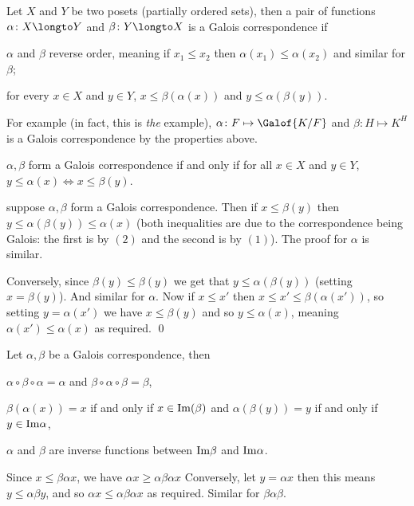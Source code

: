 \bdefn

    Let $X$ and $Y$ be two posets (partially ordered sets), then a pair of functions $\alpha\colon X\longto Y$ and $\beta\colon Y\longto X$ is a {\emphcolor Galois correspondence} if
    \benum
        \item $\alpha$ and $\beta$ reverse order, meaning if $x_1\leq x_2$ then $\alpha(x_1)\leq\alpha(x_2)$ and similar for $\beta$;
        \item for every $x\in X$ and $y\in Y$, $x\leq\beta(\alpha(x))$ and $y\leq\alpha(\beta(y))$.
    \eenum

\edefn

For example (in fact, this is {\it the} example), $\alpha\colon F\mapsto\Galof{K/F}$ and $\beta\colon H\mapsto K^H$ is a Galois correspondence by the properties above.

\bprop

    $\alpha,\beta$ form a Galois correspondence if and only if for all $x\in X$ and $y\in Y$, $y\leq\alpha(x)\iff x\leq\beta(y)$.

\eprop

\Proof suppose $\alpha,\beta$ form a Galois correspondence.
Then if $x\leq\beta(y)$ then $y\leq\alpha(\beta(y))\leq\alpha(x)$ (both inequalities are due to the correspondence being Galois: the first is by $(2)$ and the second is by $(1)$).
The proof for $\alpha$ is similar.

Conversely, since $\beta(y)\leq\beta(y)$ we get that $y\leq\alpha(\beta(y))$ (setting $x=\beta(y)$).
And similar for $\alpha$.
Now if $x\leq x'$ then $x\leq x'\leq\beta(\alpha(x'))$, so setting $y=\alpha(x')$ we have $x\leq\beta(y)$ and so $y\leq\alpha(x)$, meaning $\alpha(x')\leq\alpha(x)$ as required.
\qed

\bprop

    Let $\alpha,\beta$ be a Galois correspondence, then
    \benum
        \item $\alpha\circ\beta\circ\alpha=\alpha$ and $\beta\circ\alpha\circ\beta=\beta$,
        \item $\beta(\alpha(x))=x$ if and only if $x\in{\rm Im}(\beta)$ and $\alpha(\beta(y))=y$ if and only if $y\in{\rm Im}\alpha$,
        \item $\alpha$ and $\beta$ are inverse functions between ${\rm Im}\beta$ and ${\rm Im}\alpha$.
    \eenum

\eprop

\Proof
\benum
    \item Since $x\leq\beta\alpha x$, we have $\alpha x\geq\alpha\beta\alpha x$
    Conversely, let $y=\alpha x$ then this means $y\leq\alpha\beta y$, and so $\alpha x\leq\alpha\beta\alpha x$ as required.
    Similar for $\beta\alpha\beta$.

